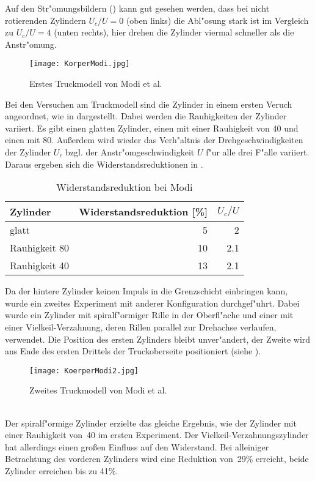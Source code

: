 Auf den Str"omungsbildern () kann gut gesehen werden, dass bei nicht rotierenden Zylindern \(U_c/U=0\) (oben links) die Abl"osung stark ist im Vergleich zu \(U_c/U=4\) (unten rechts), hier drehen die Zylinder viermal schneller als die Anstr"omung.\\
\begin{figure}[h]
	\centering
	\texttt{[image: KorperModi.jpg]}
	\caption{Erstes Truckmodell von Modi et al. \cite{MODI.1991}}
	\label{fig:Modi}
\end{figure}
Bei den Versuchen am Truckmodell sind die Zylinder in einem ersten Veruch angeordnet, wie in  dargestellt. Dabei werden die Rauhigkeiten der Zylinder variiert. Es gibt einen glatten Zylinder, einen mit einer Rauhigkeit von 40 und einen mit 80. Au\ss{}erdem wird wieder das Verh"altnis der Drehgeschwindigkeiten der Zylinder \(U_c\) bzgl. der Anstr"omgeschwindigkeit \(U\) f"ur alle drei F"alle variiert. Daraus ergeben sich die Widerstandsreduktionen in .\\
\begin{table}[h]
	\centering
	\begin{tabular}{lrr}
		\toprule
		Zylinder & Widerstandsreduktion [\%] & \(U_c/U\)\\
		\midrule
		glatt & 5 & 2\\
		Rauhigkeit 80 & 10 & 2.1\\
		Rauhigkeit 40 & 13 & 2.1\\
		\bottomrule
	\end{tabular}
	\caption{Widerstandsreduktion bei Modi}
	\label{tab:Modi}
\end{table}
Da der hintere Zylinder keinen Impuls in die Grenzschicht einbringen kann, wurde ein zweites Experiment mit anderer Konfiguration durchgef"uhrt. Dabei wurde ein Zylinder mit spiralf"ormiger Rille in der Oberfl"ache und einer mit einer Vielkeil-Verzahnung, deren Rillen parallel zur Drehachse verlaufen, verwendet. Die Position des ersten Zylinders bleibt unver"andert, der Zweite wird ans Ende des ersten Drittels der Truckoberseite positioniert (siehe ).\\
\begin{figure}[h]
	\centering
	\texttt{[image: KoerperModi2.jpg]}
	\caption{Zweites Truckmodell von Modi et al. \cite{MODI.1991}}
	\label{fig:Modi2}
\end{figure}\\
Der spiralf"ormige Zylinder erzielte das gleiche Ergebnis, wie der Zylinder mit einer Rauhigkeit von~40 im ersten Experiment. Der Vielkeil-Verzahnungszylinder hat allerdings einen gro\ss{}en Einfluss auf den Widerstand. Bei alleiniger Betrachtung des vorderen Zylinders wird eine Reduktion von~29\% erreicht, beide Zylinder erreichen bis zu 41\%.

